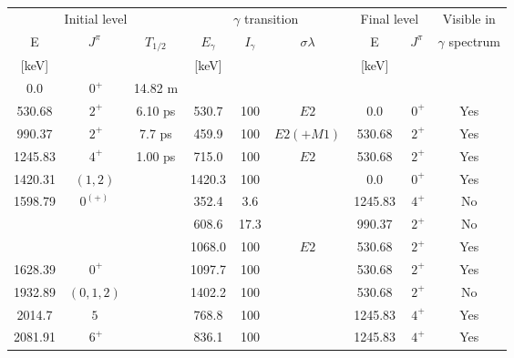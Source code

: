 \begin{tabular}{ccccccccc}
\hline
\multicolumn{3}{c}{Initial level} & \multicolumn{3}{c}{$\gamma$ transition}    & \multicolumn{2}{c}{Final level}  & Visible in        \\
E        & $J^\pi$   & $T_{1/2}$  & $E_\gamma$ & $I_\gamma$ & $\sigma \lambda$ & E               & $J^\pi$        & $\gamma$ spectrum \\
{[keV]}  &           &            & [keV]      &            &                  & [keV]           &                &                   \\
\hline
0.0      & $~0^+$    &   14.82 m  &            &            &                  &                 &                &                   \\
530.68   & $~2^+$    &    6.10 ps &  530.7     & 100        & $E2$             &    0.0          & $~0^+$         & Yes               \\
990.37   & $~2^+$    &    7.7 ps  &  459.9     & 100        & $E2(+M1)$        &  530.68         & $~2^+$         & Yes               \\
1245.83  & $~4^+$    &    1.00 ps &  715.0     & 100        & $E2$             &  530.68         & $~2^+$         & Yes               \\
1420.31  & $(1,2)$   &            & 1420.3     & 100        &                  &    0.0          & $~0^+$         & Yes               \\
1598.79  & $0^{(+)}$ &            &  352.4     &   3.6      &                  & 1245.83         & $~4^+$         & No                \\
         &           &            &  608.6     &  17.3      &                  &  990.37         & $~2^+$         & No                \\
         &           &            & 1068.0     & 100        & $E2$             &  530.68         & $~2^+$         & Yes               \\
1628.39  & $~0^+$    &            & 1097.7     & 100        &                  &  530.68         & $~2^+$         & Yes               \\
1932.89  & $(0,1,2)$ &            & 1402.2     & 100        &                  &  530.68         & $~2^+$         & No                \\
2014.7   & $5$       &            &  768.8     & 100        &                  & 1245.83         & $~4^+$         & Yes               \\
2081.91  & $~6^+$    &            &  836.1     & 100        &                  & 1245.83         & $~4^+$         & Yes               \\

\end{tabular}
